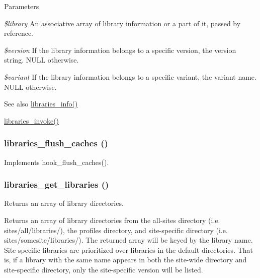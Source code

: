 \begin{DoxyParams}{Parameters}
\item[{\em \$library}]An associative array of library information or a part of it, passed by reference. \item[{\em \$version}]If the library information belongs to a specific version, the version string. NULL otherwise. \item[{\em \$variant}]If the library information belongs to a specific variant, the variant name. NULL otherwise.\end{DoxyParams}
\begin{DoxySeeAlso}{See also}
\hyperlink{libraries_8module_ae592b03bbea251cc7c008cd5ed10c861}{libraries\_\-info()} 

\hyperlink{libraries_8module_a3ac265c084e45903a8b9c4677d534f5b}{libraries\_\-invoke()} 
\end{DoxySeeAlso}
\hypertarget{libraries_8module_a1e8b67a9bc65c658aca7094765a1e1aa}{
\subsubsection[{libraries\_\-flush\_\-caches}]{\setlength{\rightskip}{0pt plus 5cm}libraries\_\-flush\_\-caches ()}}
\label{libraries_8module_a1e8b67a9bc65c658aca7094765a1e1aa}
Implements hook\_\-flush\_\-caches(). \hypertarget{libraries_8module_a7bb2b09cadaa8bb75d9d7ae892269cd0}{
\subsubsection[{libraries\_\-get\_\-libraries}]{\setlength{\rightskip}{0pt plus 5cm}libraries\_\-get\_\-libraries ()}}
\label{libraries_8module_a7bb2b09cadaa8bb75d9d7ae892269cd0}
Returns an array of library directories.

Returns an array of library directories from the all-\/sites directory (i.e. sites/all/libraries/), the profiles directory, and site-\/specific directory (i.e. sites/somesite/libraries/). The returned array will be keyed by the library name. Site-\/specific libraries are prioritized over libraries in the default directories. That is, if a library with the same name appears in both the site-\/wide directory and site-\/specific directory, only the site-\/specific version will be listed.

